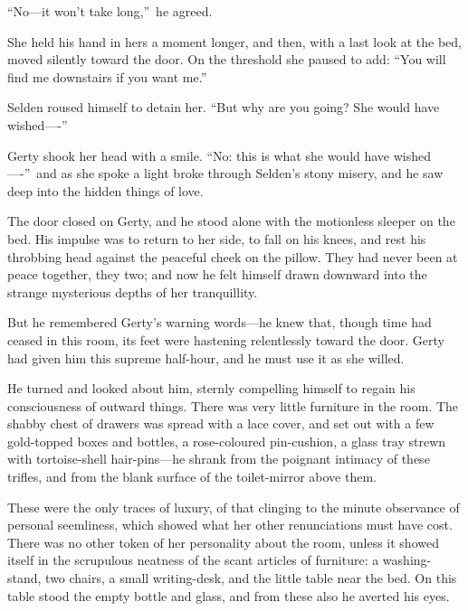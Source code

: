 \documentclass[12pt,a4paper]{book}
\begin{document}
``No---it won't take long,''\ he agreed.





She held his hand in hers a moment longer, and then, with a last
look at the bed, moved silently toward the door. On the threshold
she paused to add: ``You will find me downstairs if you want me.''





Selden roused himself to detain her. ``But why are you going? She
would have wished----''





Gerty shook her head with a smile. ``No: this is what she would
have wished----''\ and as she spoke a light broke through Selden's
stony misery, and he saw deep into the hidden things of love.





The door closed on Gerty, and he stood alone with the motionless
sleeper on the bed. His impulse was to return to her side, to
fall on his knees, and rest his throbbing head against the
peaceful cheek on the pillow. They had never been at peace
together, they two; and now he felt himself drawn downward into
the strange mysterious depths of her tranquillity.





But he remembered Gerty's warning words---he knew that, though
time had ceased in this room, its feet were hastening
relentlessly toward the door. Gerty had given him this supreme
half-hour, and he must use it as she willed.





He turned and looked about him, sternly compelling himself to
regain his consciousness of outward things. There was very little
furniture in the room. The shabby chest of drawers was spread
with a lace cover, and set out with a few gold-topped boxes and
bottles, a rose-coloured pin-cushion, a glass tray strewn with
tortoise-shell hair-pins---he shrank from the poignant intimacy of
these trifles, and from the blank surface of the toilet-mirror
above them.





These were the only traces of luxury, of that clinging to the
minute observance of personal seemliness, which showed what her
other renunciations must have cost. There was no other token of
her personality about the room, unless it showed itself in the
scrupulous neatness of the scant articles of furniture: a
washing-stand, two chairs, a small writing-desk, and the little
table near the bed. On this table stood the empty bottle and
glass, and from these also he averted his eyes.
\end{document}
